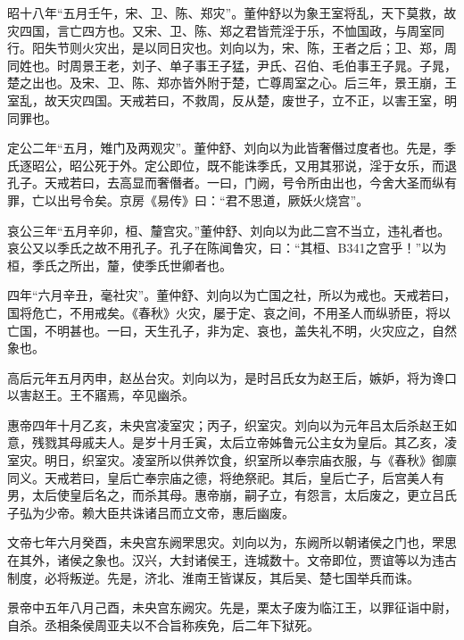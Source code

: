 \documentclass[]{article}
\begin{document}
昭十八年``五月壬午，宋、卫、陈、郑灾''。董仲舒以为象王室将乱，天下莫救，故灾四国，言亡四方也。又宋、卫、陈、郑之君皆荒淫于乐，不恤国政，与周室同行。阳失节则火灾出，是以同日灾也。刘向以为，宋、陈，王者之后；卫、郑，周同姓也。时周景王老，刘子、单子事王子猛，尹氏、召伯、毛伯事王子晁。子晁，楚之出也。及宋、卫、陈、郑亦皆外附于楚，亡尊周室之心。后三年，景王崩，王室乱，故天灾四国。天戒若曰，不救周，反从楚，废世子，立不正，以害王室，明同罪也。

定公二年``五月，雉门及两观灾''。董仲舒、刘向以为此皆奢僭过度者也。先是，季氏逐昭公，昭公死于外。定公即位，既不能诛季氏，又用其邪说，淫于女乐，而退孔子。天戒若曰，去高显而奢僭者。一曰，门阙，号令所由出也，今舍大圣而纵有罪，亡以出号令矣。京房《易传》曰：``君不思道，厥妖火烧宫''。

哀公三年``五月辛卯，桓、釐宫灾。''董仲舒、刘向以为此二宫不当立，违礼者也。哀公又以季氏之故不用孔子。孔子在陈闻鲁灾，曰：``其桓、B341之宫乎！''以为桓，季氏之所出，釐，使季氏世卿者也。

四年``六月辛丑，毫社灾''。董仲舒、刘向以为亡国之社，所以为戒也。天戒若曰，国将危亡，不用戒矣。《春秋》火灾，屡于定、哀之间，不用圣人而纵骄臣，将以亡国，不明甚也。一曰，天生孔子，非为定、哀也，盖失礼不明，火灾应之，自然象也。

高后元年五月丙申，赵丛台灾。刘向以为，是时吕氏女为赵王后，嫉妒，将为谗口以害赵王。王不寤焉，卒见幽杀。

惠帝四年十月乙亥，未央宫凌室灾；丙子，织室灾。刘向以为元年吕太后杀赵王如意，残戮其母戚夫人。是岁十月壬寅，太后立帝姊鲁元公主女为皇后。其乙亥，凌室灾。明日，织室灾。凌室所以供养饮食，织室所以奉宗庙衣服，与《春秋》御廪同义。天戒若曰，皇后亡奉宗庙之德，将绝祭祀。其后，皇后亡子，后宫美人有男，太后使皇后名之，而杀其母。惠帝崩，嗣子立，有怨言，太后废之，更立吕氏子弘为少帝。赖大臣共诛诸吕而立文帝，惠后幽废。

文帝七年六月癸酉，未央宫东阙罘思灾。刘向以为，东阙所以朝诸侯之门也，罘思在其外，诸侯之象也。汉兴，大封诸侯王，连城数十。文帝即位，贾谊等以为违古制度，必将叛逆。先是，济北、淮南王皆谋反，其后吴、楚七国举兵而诛。

景帝中五年八月己酉，未央宫东阙灾。先是，栗太子废为临江王，以罪征诣中尉，自杀。丞相条侯周亚夫以不合旨称疾免，后二年下狱死。
\end{document}
